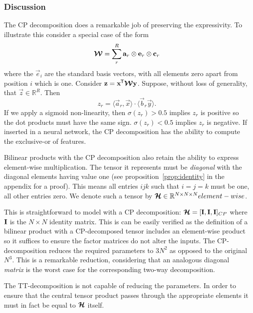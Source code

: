 \subsubsection{Discussion}
The CP decomposition does a remarkable job of preserving the expressivity. To illustrate this
consider a special case of the form 
\begin{equation}
	\bm{\mathcal{W}} = \sum_r^R \mathbf{a}_r \otimes \mathbf{e}_r \otimes \mathbf{c}_r
\end{equation} where the \(\vec{e}_i\) are the standard basis vectors, with all elements zero apart
from position \(i\) which is one. Consider \(\mathbf{z} = \mathbf{x}^{\mkern-1.5mu\mathsf{T}}\bm{\mathcal{W}}\mathbf{y}\). Suppose,
without loss of generality, that \(\vec{z} \in \mathbb{R}^R\). Then
\begin{equation}\label{eq:xorfeatures}
	z_r = \langle \vec{a}_r, \vec{x} \rangle \cdot \langle \vec{b}_r \vec{y}\rangle.
\end{equation} If we apply a sigmoid non-linearity, then \(\sigma(z_r) > 0.5\) implies \(z_r\) is
positive so the dot products must have the same sign. \(\sigma(z_r) < 0.5\) implies \(z_r\) is 
negative. If inserted in a neural network, the CP decomposition has the ability to compute the
exclusive-or of features.

Bilinear products with the CP decomposition also retain the ability to express element-wise
multiplication. The tensor it represents must be \textit{diagonal} with the
 diagonal elements having value one
 (see proposition~\ref{prop:identity} in the appendix for a proof). This means all entries
\(ijk\) such that \(i = j = k\) must be one, all other entries zero. We denote such a tensor
by \(\bm{\mathcal{H}} \in \mathbb{R}^{N \times N \times N}element-wise\).

This is straightforward to model with a CP decomposition:
\(\bm{\mathcal{H}} = [\mathbf{I}, \mathbf{I}, \mathbf{I}]_{CP}\) where \(\mathbf{I}\) is the 
\(N\times N\) identity matrix. This is can be easily verified as the definition of a bilinear
product with a CP-decomposed tensor includes an element-wise product so it suffices to ensure the
factor matrices do not alter the inputs. The CP-decomposition reduces the required parameters
to \(3N^2\) as opposed to the original \(N^3\). This is a remarkable reduction, considering that
an analogous diagonal \emph{matrix} is the worst case for the corresponding two-way 
decomposition. 

The TT-decomposition is not capable of reducing the parameters. In order to ensure that the
central tensor product passes through the appropriate elements it must in
fact be equal to \(\bm{\mathcal{H}}\) itself.


